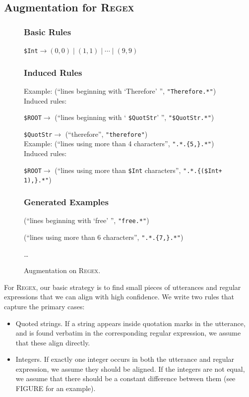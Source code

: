 \documentclass[11pt,letterpaper]{article}
\newcommand{\regex}{\textsc{Regex}\xspace}
\newcommand{\catroot}{\texttt{\$ROOT}\xspace}
\newcommand{\catquotstr}{\texttt{\$QuotStr}\xspace}
\newcommand{\catint}{\texttt{\$Int}\xspace}
\begin{document}
\subsection{Augmentation for \regex}
\begin{figure}[t] 
\begin{framed}
\subsubsection*{Basic Rules}
\catint $\to (0, 0) \mid (1, 1) \mid \dotsb \mid (9, 9)$

\subsubsection*{Induced Rules}
Example: (``lines beginning with `Therefore' '', \texttt{"Therefore.*"})\\
Induced rules:

\qquad \catroot $\to$ (``lines beginning with ` \catquotstr ' '', \texttt{"}\catquotstr\texttt{.*"})

\qquad \catquotstr $\to$ (``therefore'', \texttt{"therefore"}) \\

Example: (``lines using more than 4 characters'', \texttt{".*.\{5,\}.*"})\\
Induced rules:

\qquad \catroot $\to$ (``lines using more than \catint characters'', \texttt{".*.\{(\catint + 1),\}.*"})

\subsubsection*{Generated Examples} 
(``lines beginning with `free' '', \texttt{"free.*"})

(``lines using more than 6 characters'', \texttt{".*.\{7,\}.*"})

\dots
\end{framed}
\caption{Augmentation on \regex.}
\label{fig:overview}
\end{figure}

For \regex, our basic strategy is to find small pieces of 
utterances and regular expressions that we can align with high confidence.
We write two rules that capture the primary cases:
\begin{itemize}
  \item Quoted strings.  If a string appears inside quotation marks
    in the utterance, and is found verbatim in the corresponding
    regular expression, we assume that these align directly.
  \item Integers.  If exactly one integer occurs in both the 
    utterance and regular expression, we assume they should be aligned.
    If the integers are not equal, we assume that there should be
    a constant difference between them (see FIGURE for an example).
\end{itemize}
\end{document}
